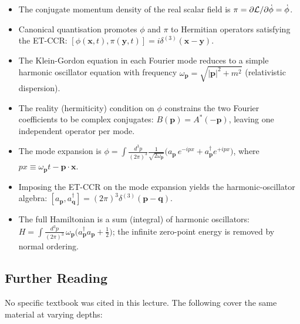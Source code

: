 \begin{itemize}
  \item The conjugate momentum density of the real scalar field is
    $\pi = \partial\mathcal{L}/\partial\dot{\phi} = \dot{\phi}$.
  \item Canonical quantisation promotes $\phi$ and $\pi$ to Hermitian
    operators satisfying the ET-CCR:
    $[\phi(\mathbf{x},t),\pi(\mathbf{y},t)]=i\delta^{(3)}(\mathbf{x}-\mathbf{y})$.
  \item The Klein-Gordon equation in each Fourier mode reduces to a
    simple harmonic oscillator equation with frequency
    $\omega_{\mathbf{p}}=\sqrt{|\mathbf{p}|^2+m^2}$ (relativistic dispersion).
  \item The reality (hermiticity) condition on $\phi$ constrains the two
    Fourier coefficients to be complex conjugates:
    $B(\mathbf{p})=A^*(-\mathbf{p})$, leaving one independent operator
    per mode.
  \item The mode expansion is
    $\phi = \int \frac{d^3p}{(2\pi)^3}\frac{1}{\sqrt{2\omega_{\mathbf{p}}}}
    \bigl(a_{\mathbf{p}}\,e^{-ipx}+a_{\mathbf{p}}^\dagger e^{+ipx}\bigr)$,
    where $px\equiv\omega_{\mathbf{p}}t - \mathbf{p}\cdot\mathbf{x}$.
  \item Imposing the ET-CCR on the mode expansion yields the
    harmonic-oscillator algebra:
    $[a_{\mathbf{p}}, a_{\mathbf{q}}^\dagger]=(2\pi)^3\delta^{(3)}(\mathbf{p}-\mathbf{q})$.
  \item The full Hamiltonian is a sum (integral) of harmonic oscillators:
    $H=\int\frac{d^3p}{(2\pi)^3}\,\omega_{\mathbf{p}}
    \bigl(a_{\mathbf{p}}^\dagger a_{\mathbf{p}}+\tfrac{1}{2}\bigr)$;
    the infinite zero-point energy is removed by normal ordering.
\end{itemize}

\subsection*{Further Reading}

No specific textbook was cited in this lecture.  The following cover the same
material at varying depths:


